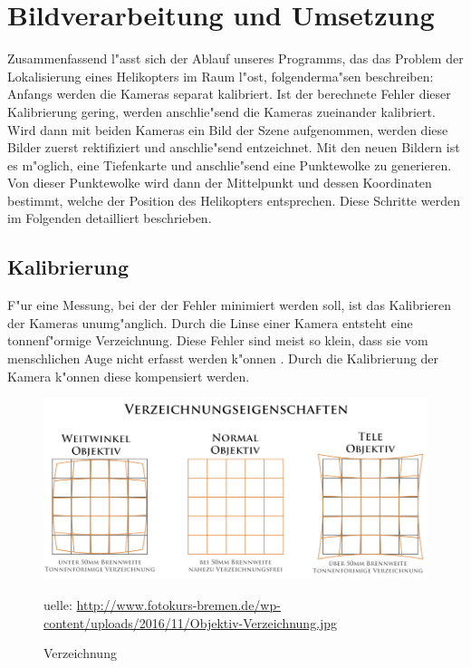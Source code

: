 \chapter{Bildverarbeitung und Umsetzung}
\label{cha:verarbeitungumsetzung}

Zusammenfassend l"asst sich der Ablauf unseres Programms,
das das Problem der Lokalisierung eines Helikopters im Raum l"ost, folgenderma"sen beschreiben:\newline
Anfangs werden die Kameras separat kalibriert. Ist der berechnete Fehler dieser Kalibrierung gering, werden anschlie"send die Kameras zueinander kalibriert. Wird dann mit beiden Kameras ein Bild der Szene aufgenommen, werden diese Bilder zuerst rektifiziert und anschlie"send entzeichnet. Mit den neuen Bildern ist es m"oglich, eine Tiefenkarte und anschlie"send eine Punktewolke zu generieren. Von dieser Punktewolke wird dann der Mittelpunkt und dessen Koordinaten bestimmt, welche der Position des Helikopters entsprechen.\newline
Diese Schritte werden im Folgenden detailliert beschrieben.

\section{Kalibrierung}
\label{sec:kalibrierung}

F"ur eine Messung, bei der der Fehler minimiert werden soll, ist das Kalibrieren der Kameras unumg"anglich. Durch die Linse einer Kamera entsteht eine tonnenf"ormige Verzeichnung. Diese Fehler sind meist so klein, dass sie vom menschlichen Auge nicht erfasst werden k"onnen \cite{VZ} \cite{VZ1}. Durch die Kalibrierung der Kamera k"onnen diese kompensiert werden.\newline

\begin{figure}[H]
	\includegraphics[scale=0.45]{bilder/verzeichnung}
	\caption[Verzeichnung]{Verzeichnung}
	\label{fig:verzeichnung}
	\small  uelle: \url{http://www.fotokurs-bremen.de/wp-content/uploads/2016/11/Objektiv-Verzeichnung.jpg}
\end{figure}

